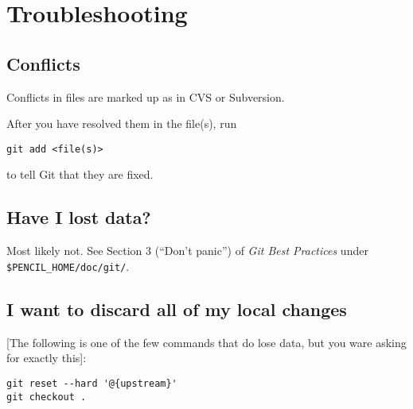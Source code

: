 \documentclass[12pt,pdftex]{article}
\begin{document}
\section{Troubleshooting}

\subsection{Conflicts}

Conflicts in files are marked up as in CVS or Subversion.

After you have resolved them in the file(s), run
\begin{lstlisting}
git add <file(s)>
\end{lstlisting}
to tell Git that they are fixed.


\subsection{Have I lost data?}

Most likely not.
See Section 3 (“Don't panic”) of \emph{Git Best Practices} under
\texttt{\$PENCIL\_HOME/doc/git/}.


\subsection{I want to discard all of my local changes}

[The following is one of the few commands that do lose data, but you
ware asking for exactly this]:
\begin{lstlisting}
git reset --hard '@{upstream}'
git checkout .
\end{lstlisting}
\end{document}

